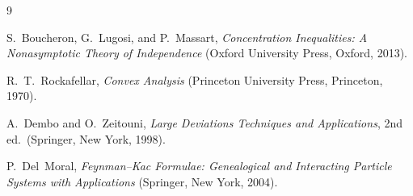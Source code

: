\documentclass[aps,prx,reprint,superscriptaddress,nobibnotes,longbibliography]{revtex4-2}
\begin{document}
\begin{thebibliography}{9}

 S.~Boucheron, G.~Lugosi, and P.~Massart,
\emph{Concentration Inequalities: A Nonasymptotic Theory of Independence}
(Oxford University Press, Oxford, 2013).

 R.~T.~Rockafellar, \emph{Convex Analysis}
(Princeton University Press, Princeton, 1970).

 A.~Dembo and O.~Zeitouni, \emph{Large
Deviations Techniques and Applications}, 2nd ed.\ (Springer, New York,
1998).

 P.~Del~Moral, \emph{Feynman--Kac Formulae:
Genealogical and Interacting Particle Systems with Applications}
(Springer, New York, 2004).

\end{thebibliography}
\end{document}
